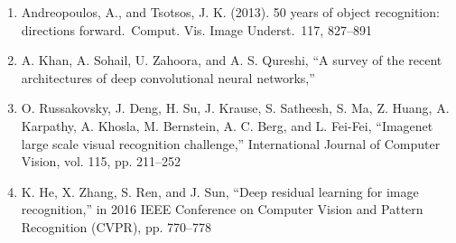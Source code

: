 \begin{enumerate}
    \item Andreopoulos, A., and Tsotsos, J. K. (2013). 50 years of object recognition: directions forward. Comput. Vis. Image Underst. 117, 827–891
    
    \item A. Khan, A. Sohail, U. Zahoora, and A. S. Qureshi, “A survey of the recent architectures of deep convolutional neural networks,”
    
    \item O. Russakovsky, J. Deng, H. Su, J. Krause, S. Satheesh, S. Ma, Z. Huang, A. Karpathy, A. Khosla, M. Bernstein, A. C. Berg, and L. Fei-Fei, “Imagenet large scale visual recognition challenge,” International Journal of Computer Vision, vol. 115, pp. 211–252
    
    \item K. He, X. Zhang, S. Ren, and J. Sun, “Deep residual learning for image recognition,” in 2016 IEEE Conference on Computer Vision and Pattern Recognition (CVPR), pp. 770–778
    



    
\end{enumerate}

\newpage